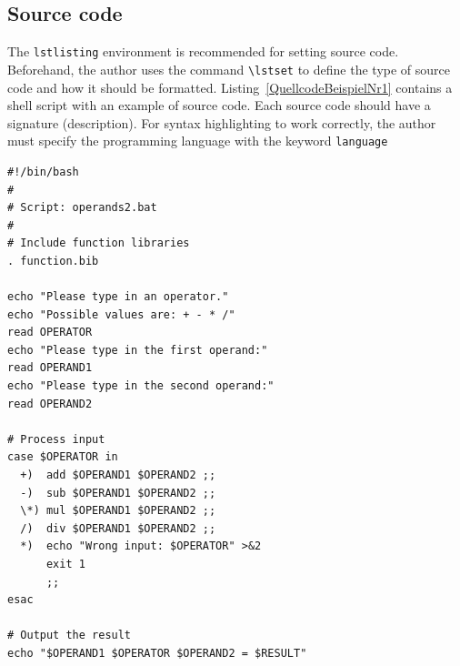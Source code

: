 \documentclass{llncs}
\begin{document}
\subsection{Source code}

The \verb!lstlisting! environment is recommended for setting source code. Beforehand, the author uses the command \verb!\lstset! to define the type of source code and how it should be formatted. Listing~\ref{QuellcodeBeispielNr1} contains a shell script with an example of source code. Each source code should have a signature (description). For syntax highlighting to work correctly, the author must specify the programming language with the keyword \verb!language!


\lstset{
language=Bash,
captionpos=b, 
caption=This is the signature of the source code, 
label=QuellcodeBeispielNr1,
basicstyle=\ttfamily\footnotesize,      %
keywordstyle=\color{FrankfurtBlue},     %
commentstyle=\color{gray},              %
numbers=left,                           %
numberstyle=\footnotesize,              %
stepnumber=1,                           %
numbersep=5pt,                          %
backgroundcolor=\color{lightlightgray}, %
frame=none,                             %
tabsize=2,                              %
captionpos=b,                           %
breaklines=true,                        %
breakatwhitespace=false,                %
showspaces=false,                       %
showstringspaces=false                  %
showtabs=false,                         %
columns=fixed,                          %
morekeywords={},                        %
literate=%
  {Ö}{{\"O}}1
{Ä}{{\"A}}1
{Ü}{{\"U}}1
{ö}{{\"o}}1
{ä}{{\"a}}1
{ü}{{\"u}}1
{ß}{{\ss}}1
{~}{{\textasciitilde}}1
}
\begin{lstlisting}
#!/bin/bash
#
# Script: operands2.bat
#
# Include function libraries
. function.bib

echo "Please type in an operator."
echo "Possible values are: + - * /"
read OPERATOR
echo "Please type in the first operand:"
read OPERAND1
echo "Please type in the second operand:"
read OPERAND2

# Process input 
case $OPERATOR in
  +)  add $OPERAND1 $OPERAND2 ;;
  -)  sub $OPERAND1 $OPERAND2 ;;
  \*) mul $OPERAND1 $OPERAND2 ;;
  /)  div $OPERAND1 $OPERAND2 ;;
  *)  echo "Wrong input: $OPERATOR" >&2
      exit 1
      ;;
esac

# Output the result
echo "$OPERAND1 $OPERATOR $OPERAND2 = $RESULT"
\end{lstlisting}
\end{document}

